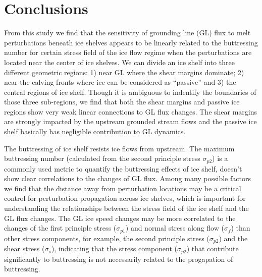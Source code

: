 \documentclass[review,oneside]{igs}
\begin{document}
%
%
%
%
%
%


\section{Conclusions}

From this study we find that the sensitivity of grounding line (GL) flux to melt perturbations beneath ice shelves appears to be linearly related to the buttressing number for certain stress field of the ice flow regime when the perturbations are located near the center of ice shelves. We can divide an ice shelf into three different geometric regions: 1) near GL where the shear margins dominate; 2) near the calving fronts where ice can be considered as ``passive'' and 3) the central regions of ice shelf. Though it is ambiguous to indentify the boundaries of those three sub-regions, we find that both the shear margins and passive ice regions show very weak linear connections to GL flux changes. The shear margins are strongly impacted by the upstream grounded stream flows and the passive ice shelf basically has negligible contribution to GL dynamics. 

The buttressing of ice shelf resists ice flows from upstream. The maximum buttressing number (calculated from the second principle stress $\sigma_{p2}$) is a commonly used metric to quantify the buttressing effects of ice shelf, doesn't show clear correlations to the changes of GL flux. Among many possible factors we find that the distance away from perturbation locations may be a critical control for perturbation propagation across ice shelves, which is important for understanding the relationships between the stress field of the ice shelf and the GL flux changes. The GL ice speed changes may be more correlated to the changes of the first principle stress ($\sigma_{p1}$) and normal stress along flow ($\sigma_{f}$) than other stress components, for example, the second principle stress ($\sigma_{p2}$) and the shear stress ($\sigma_s$), indicating that the stress component ($\sigma_{p2}$) that contribute significantly to buttressing is not necessarily related to the progapation of buttressing. 
\end{document}
